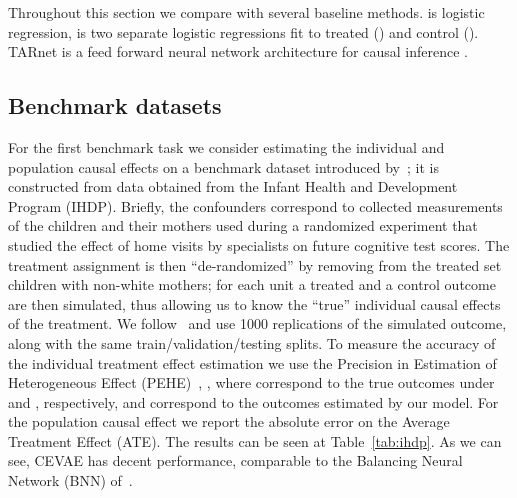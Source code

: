 \documentclass{article}
\begin{document}
Throughout this section we compare with several baseline methods.  is logistic regression,  is two separate logistic regressions fit to treated () and control (). TARnet is a feed forward neural network architecture for causal inference \citep{shalit2016estimating}. 

\subsection{Benchmark datasets}
For the first benchmark task we consider estimating the individual and population causal effects on a benchmark dataset introduced by~\cite{hill2011bayesian}; it is constructed from data obtained from the Infant Health and Development Program (IHDP). Briefly, the confounders  correspond to collected measurements of the children and their mothers used during a randomized experiment that studied the effect of home visits by specialists on future cognitive test scores. The treatment assignment is then ``de-randomized'' by removing from the treated set children with non-white mothers; for each unit a treated and a control outcome are then simulated, thus allowing us to know the ``true'' individual causal effects of the treatment. 
We follow~\cite{johansson2016learning,shalit2016estimating} and use 1000 replications of the simulated outcome, along with the same train/validation/testing splits. To measure the accuracy of the individual treatment effect estimation we use the Precision in Estimation of Heterogeneous Effect (PEHE)~\citep{hill2011bayesian}, , where  correspond to the true outcomes under  and , respectively, and  correspond to the outcomes estimated by our model. For the population causal effect we report the absolute error on the Average Treatment Effect (ATE). The results can be seen at Table~\ref{tab:ihdp}. As we can see, CEVAE has decent performance, comparable to the Balancing Neural Network (BNN) of~\cite{johansson2016learning}. 
\end{document}
